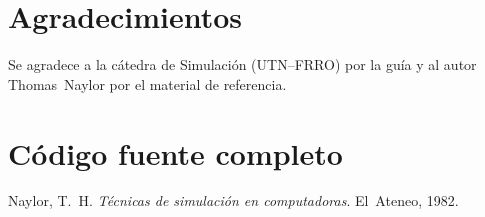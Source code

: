 \documentclass[11pt,a4paper]{article}
\begin{document}
\section*{Agradecimientos}
Se agradece a la cátedra de Simulación (UTN--FRRO) por la guía
y al autor Thomas~Naylor por el material de referencia.

\appendix
\section{Código fuente completo}
\label{app:codigo}


\begin{thebibliography}{9}
Naylor, T.~H. \emph{Técnicas de simulación en computadoras}. El~Ateneo, 1982.
\end{thebibliography}
\end{document}
